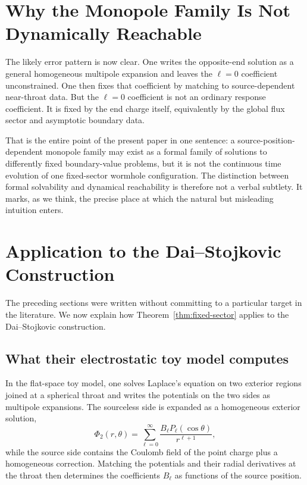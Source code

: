 \documentclass[aps,prd,onecolumn,nofootinbib,superscriptaddress]{revtex4-2}
\begin{document}
\section{Why the Monopole Family Is Not Dynamically Reachable}

The likely error pattern is now clear. One writes the opposite-end solution as a general homogeneous multipole expansion and leaves the $\ell=0$ coefficient unconstrained. One then fixes that coefficient by matching to source-dependent near-throat data. But the $\ell=0$ coefficient is not an ordinary response coefficient. It is fixed by the end charge itself, equivalently by the global flux sector and asymptotic boundary data.

That is the entire point of the present paper in one sentence: a source-position-dependent monopole family may exist as a formal family of solutions to differently fixed boundary-value problems, but it is not the continuous time evolution of one fixed-sector wormhole configuration. The distinction between formal solvability and dynamical reachability is therefore not a verbal subtlety. It marks, as we think, the precise place at which the natural but misleading intuition enters.

\section{Application to the Dai--Stojkovic Construction}

The preceding sections were written without committing to a particular target in the literature. We now explain how Theorem~\ref{thm:fixed-sector} applies to the Dai--Stojkovic construction.\cite{DaiStojkovic2019Observing,Krasnikov2020CommentObserving,DaiStojkovic2020ReplyObserving}

\subsection{What their electrostatic toy model computes}

In the flat-space toy model, one solves Laplace's equation on two exterior regions joined at a spherical throat and writes the potentials on the two sides as multipole expansions. The sourceless side is expanded as a homogeneous exterior solution,
\begin{equation}
\Phi_{2}(r,\theta)=\sum_{\ell=0}^{\infty}\frac{B_\ell P_\ell(\cos\theta)}{r^{\ell+1}},
\end{equation}
while the source side contains the Coulomb field of the point charge plus a homogeneous correction. Matching the potentials and their radial derivatives at the throat then determines the coefficients $B_\ell$ as functions of the source position.
\end{document}
